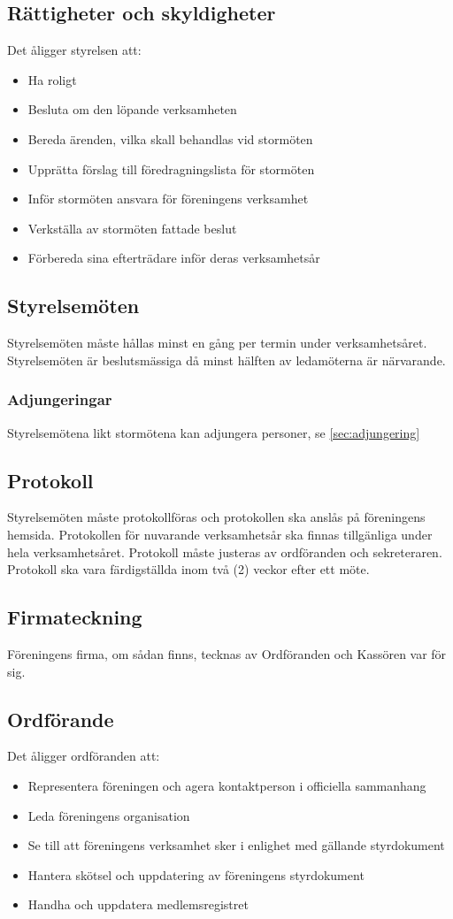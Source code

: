 \documentclass[11pt,a4paper]{article}
\begin{document}
\subsection{Rättigheter och skyldigheter}
Det åligger styrelsen att:
\begin{itemize}
	\item Ha roligt
	\item Besluta om den löpande verksamheten
	\item Bereda ärenden, vilka skall behandlas vid stormöten
	\item Upprätta förslag till föredragningslista för stormöten
	\item Inför stormöten ansvara för föreningens verksamhet
	\item Verkställa av stormöten fattade beslut
	\item Förbereda sina efterträdare inför deras verksamhetsår
\end{itemize}
\subsection{Styrelsemöten}
Styrelsemöten måste hållas minst en gång per termin under verksamhetsåret. Styrelsemöten är beslutsmässiga då minst hälften av ledamöterna är närvarande.
\subsubsection{Adjungeringar}
Styrelsemötena likt stormötena kan adjungera personer, se \ref{sec:adjungering}
\subsection{Protokoll}
Styrelsemöten måste protokollföras och protokollen ska anslås på föreningens
hemsida. Protokollen för nuvarande verksamhetsår ska finnas tillgänliga under
hela verksamhetsåret. Protokoll måste justeras av ordföranden och sekreteraren.
Protokoll ska vara färdigställda inom två (2) veckor efter ett möte.
\subsection{Firmateckning}
Föreningens firma, om sådan finns, tecknas av Ordföranden och Kassören var för sig.
\subsection{Ordförande}\label{sec:ordf}
Det åligger ordföranden att:
\begin{itemize}
	\item Representera föreningen och agera kontaktperson i officiella sammanhang
	\item Leda föreningens organisation
	\item Se till att föreningens verksamhet sker i enlighet med gällande styrdokument
	\item Hantera skötsel och uppdatering av föreningens styrdokument
	\item Handha och uppdatera medlemsregistret
\end{itemize}
\end{document}
